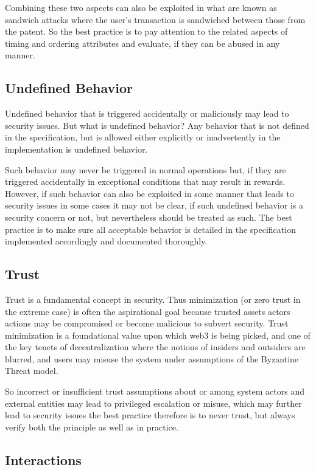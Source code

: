 Combining these two aspects can also be exploited in what are known as
sandwich attacks where the user's transaction is sandwiched between
those from the patent. So the best practice is to pay attention to the
related aspects of timing and ordering attributes and evaluate, if they
can be abused in any manner.

\subsection{Undefined Behavior}\label{undefined-behavior}

Undefined behavior that is triggered accidentally or maliciously may
lead to security issues. But what is undefined behavior? Any behavior
that is not defined in the specification, but is allowed either
explicitly or inadvertently in the implementation is undefined behavior.

Such behavior may never be triggered in normal operations but, if they
are triggered accidentally in exceptional conditions that may result in
rewards. However, if such behavior can also be exploited in some manner
that leads to security issues in some cases it may not be clear, if such
undefined behavior is a security concern or not, but nevertheless should
be treated as such. The best practice is to make sure all acceptable
behavior is detailed in the specification implemented accordingly and
documented thoroughly.

\subsection{Trust}\label{trust}

Trust is a fundamental concept in security. Thus minimization (or zero
trust in the extreme case) is often the aspirational goal because
trusted assets actors actions may be compromised or become malicious to
subvert security. Trust minimization is a foundational value upon which
web3 is being picked, and one of the key tenets of decentralization
where the notions of insiders and outsiders are blurred, and users may
misuse the system under assumptions of the Byzantine Threat model.

So incorrect or insufficient trust assumptions about or among system
actors and external entities may lead to privileged escalation or
misuse, which may further lead to security issues the best practice
therefore is to never trust, but always verify both the principle as
well as in practice.

\subsection{Interactions}\label{interactions}

